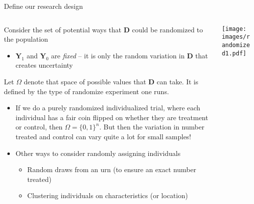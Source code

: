 \documentclass[notes,11pt, aspectratio=169]{beamer}
\newenvironment{wideitemize}{\itemize\addtolength{\itemsep}{10pt}}{\enditemize}
\begin{document}
\begin{frame}{Define our research design}
\begin{columns}[T] %
  \begin{column}{.7\textwidth}
  \begin{wideitemize}
  \item Consider the set of potential ways that $\mathbf{D}$ could be randomized to the population
    \begin{itemize}
    \item $\mathbf{Y}_{1}$ and $\mathbf{Y}_0$ are \emph{fixed} -- it
      is only the random variation in $\mathbf{D}$ that creates
      uncertainty
    \end{itemize}
  \item Let $\Omega$ denote that space of possible values that
      $\mathbf{D}$ can take. It is defined by the type of randomize
      experiment one runs.
      \begin{itemize}
      \item If we do a purely randomized individualized trial, where
        each individual has a fair coin flipped on whether they are
        treatment or control, then $\Omega = \{0,1\}^{n}$. But then
        the variation in number treated and control can vary quite a
        lot for small samples!
      \item Other ways to consider randomly assigning individuals
        \begin{itemize}
        \item Random draws from an urn (to ensure an exact number treated)
        \item Clustering individuals on characteristics (or location)
        \end{itemize}
      \end{itemize}
    \end{wideitemize}
  \end{column}%
  \hfill%
  \begin{column}{.4\textwidth}
    \texttt{[image: images/randomized1.pdf]}
  \end{column}%
\end{columns}
\end{frame}
\end{document}
